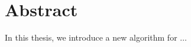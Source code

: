 \thispagestyle{empty}
\section*{Abstract}

\bigskip 


In this thesis, we introduce a new algorithm for $\ldots$